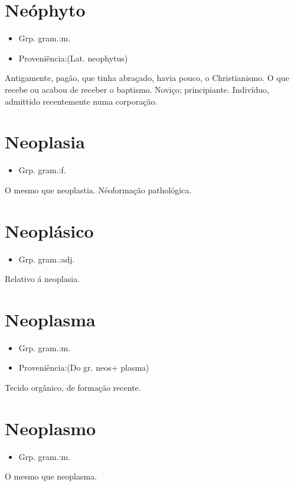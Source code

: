 \section{Neóphyto}
\begin{itemize}
\item {Grp. gram.:m.}
\end{itemize}
\begin{itemize}
\item {Proveniência:(Lat. \textunderscore neophytus\textunderscore )}
\end{itemize}
Antigamente, pagão, que tinha abraçado, havia pouco, o Christianismo.
O que recebe ou acabou de receber o baptismo.
Noviço; principiante.
Indivíduo, admittido recentemente numa corporação.
\section{Neoplasia}
\begin{itemize}
\item {Grp. gram.:f.}
\end{itemize}
O mesmo que \textunderscore neoplastia\textunderscore .
Néoformação pathológica.
\section{Neoplásico}
\begin{itemize}
\item {Grp. gram.:adj.}
\end{itemize}
Relativo á neoplasia.
\section{Neoplasma}
\begin{itemize}
\item {Grp. gram.:m.}
\end{itemize}
\begin{itemize}
\item {Proveniência:(Do gr. \textunderscore neos\textunderscore  + \textunderscore plasma\textunderscore )}
\end{itemize}
Tecido orgânico, de formação recente.
\section{Neoplasmo}
\begin{itemize}
\item {Grp. gram.:m.}
\end{itemize}
O mesmo que \textunderscore neoplasma\textunderscore .
